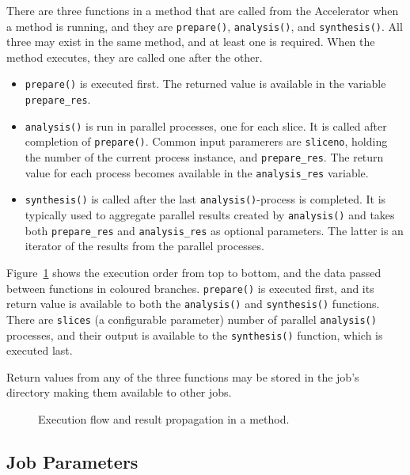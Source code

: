 There are three functions in a method that are called from the
Accelerator when a method is running, and they are \texttt{prepare()},
\texttt{analysis()}, and \texttt{synthesis()}.  All three may exist in
the same method, and at least one is required.  When the method
executes, they are called one after the other.
\begin{itemize}
\item[] \texttt{prepare()} is executed first.  The returned value is
  available in the variable \texttt{prepare\_res}.
\item[] \texttt{analysis()} is run in parallel processes, one for each
  slice.  It is called after completion of \texttt{prepare()}.  Common
  input paramerers are \texttt{sliceno}, holding the number of the
  current process instance, and \texttt{prepare\_res}.  The return
  value for each process becomes available in the
  \texttt{analysis\_res} variable.
\item[] \texttt{synthesis()} is called after the last
  \texttt{analysis()}-process is completed.  It is typically used to
  aggregate parallel results created by \texttt{analysis()} and takes
  both \texttt{prepare\_res} and \texttt{analysis\_res} as optional
  parameters.  The latter is an iterator of the results from the
  parallel processes.
\end{itemize}
Figure~\ref{fig:prepanasyn} shows the execution order from top to
bottom, and the data passed between functions in coloured branches.
\texttt{prepare()} is executed first, and its return value is
available to both the \texttt{analysis()} and \texttt{synthesis()}
functions.  There are \texttt{slices} (a configurable parameter)
number of parallel \texttt{analysis()} processes, and their output is
available to the \texttt{synthesis()} function, which is executed
last.

Return values from any of the three functions may be stored in the
job's directory making them available to other jobs.


\begin{figure}[h!]
  \begin{center}
    
    \caption{Execution flow and result propagation in a method.}
    \label{fig:prepanasyn}
  \end{center}
\end{figure}
\subsection{Job Parameters}



